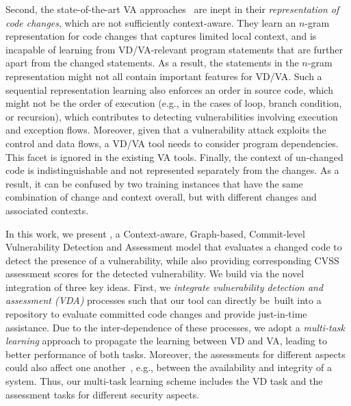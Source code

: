 Second, the state-of-the-art VA approaches~\cite{deepCVA-ase21} are
inept in their {\em representation of code changes},
which are not sufficiently context-aware.
They learn an $n$-gram
representation for code changes that captures limited local context,
and is incapable of learning from VD/VA-relevant program statements
that are further apart from the changed statements.  As a result, the
statements in the $n$-gram representation might not all contain
important features for VD/VA. Such a sequential representation
learning also enforces an order in source code, which might not be the
order of execution (e.g., in the cases of loop, branch condition, or
recursion), which contributes to detecting vulnerabilities involving
execution and exception flows. Moreover, given that a vulnerability
attack exploits the control and data flows, a VD/VA tool needs to
consider program dependencies.  This facet is ignored
in the existing VA tools.
Finally, the context of un-changed code is indistinguishable and not
represented separately from the changes. As a result, it can be
confused by two training instances that have the same combination
of change and context overall, but with different changes and
associated contexts.

In this work, we present {\tool}, a Context-aware, Graph-based,
Commit-level Vulnerability Detection and Assessment model that
evaluates a changed code to detect the presence of a vulnerability,
while also providing corresponding CVSS assessment scores for the
detected vulnerability. We build {\tool} via the novel integration of
three key ideas.  First, we {\em integrate vulnerability detection and
  assessment (VDA)} processes such that our tool can directly be~built
into a repository to evaluate committed code changes and provide
just-in-time assistance. Due to the inter-dependence of these
processes, we adopt a {\em multi-task learning} approach to propagate
the learning between VD and VA, leading to better performance of both
tasks. Moreover, the assessments for different aspects could also
affect one another~\cite{deepCVA-ase21}, e.g., between the
availability and integrity of a system. Thus, our multi-task learning
scheme includes the VD task and the assessment tasks for different
security aspects.

